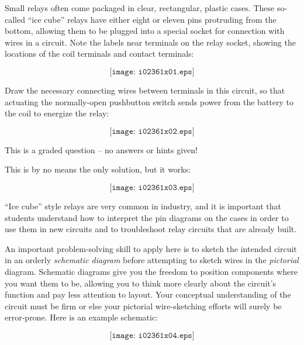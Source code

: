 

Small relays often come packaged in clear, rectangular, plastic cases.  These so-called ``ice cube'' relays have either eight or eleven pins protruding from the bottom, allowing them to be plugged into a special socket for connection with wires in a circuit.  Note the labels near terminals on the relay socket, showing the locations of the coil terminals and contact terminals:

$$\texttt{[image: i02361x01.eps]}$$

Draw the necessary connecting wires between terminals in this circuit, so that actuating the normally-open pushbutton switch sends power from the battery to the coil to energize the relay:

\vskip 20pt

$$\texttt{[image: i02361x02.eps]}$$

\vfil 

\eject






This is a graded question -- no answers or hints given!
 






This is by no means the only solution, but it works:

$$\texttt{[image: i02361x03.eps]}$$

``Ice cube'' style relays are very common in industry, and it is important that students understand how to interpret the pin diagrams on the cases in order to use them in new circuits and to troubleshoot relay circuits that are already built.

\vskip 10pt

An important problem-solving skill to apply here is to sketch the intended circuit in an orderly {\it schematic diagram} before attempting to sketch wires in the {\it pictorial} diagram.  Schematic diagrams give you the freedom to position components where you want them to be, allowing you to think more clearly about the circuit's function and pay less attention to layout.  Your conceptual understanding of the circuit must be firm or else your pictorial wire-sketching efforts will surely be error-prone.  Here is an example schematic:

$$\texttt{[image: i02361x04.eps]}$$




